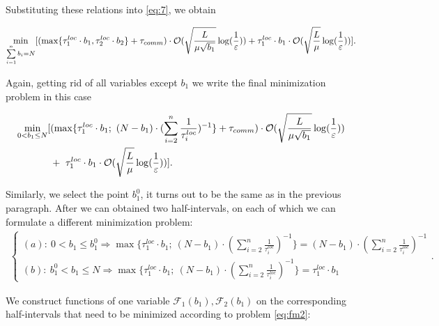 \documentclass{article}
\theoremstyle{definition}
\theoremstyle{plain}
\begin{document}
Substituting these relations into \eqref{eq:7}, we obtain

\begin{equation}
    \notag
    \underset{\sum\limits_{i = 1}^{n} b_i = N}{\min}[(\max\{\tau_1^{loc}\cdot b_1, \tau_2^{loc}\cdot b_2\} + \tau_{comm}) \cdot \mathcal O(\sqrt{\frac{L}{\mu \sqrt{b_1}}}\log(\frac{1}{\varepsilon})) + \tau_1^{loc}\cdot b_1 \cdot \mathcal O(\sqrt{\frac{L}{\mu}}\log(\frac{1}{\varepsilon}))].
\end{equation}

Again, getting rid of all variables except $b_1$ we write the final minimization problem in this case

\begin{eqnarray}
    \begin{split}
    \label{eq:fm2}
        \underset{0 < b_1 \leq N}{\min}[&(\max\{\tau_1^{loc}\cdot b_1; ~(N-b_1) \cdot (\sum\limits_{i = 2}^{n} \frac{1}{\tau_i^{loc}} )^{-1}\} + \tau_{comm}) \cdot \mathcal O(\sqrt{\frac{L}{\mu \sqrt{b_1}}}\log(\frac{1}{\varepsilon}))
        \\ &+ ~
        \tau_1^{loc}\cdot b_1 \cdot \mathcal O(\sqrt{\frac{L}{\mu}}\log(\frac{1}{\varepsilon}))]. \hspace{3.7cm}
    \end{split}
\end{eqnarray}

Similarly, we select the point $b_1^0$, it turns out to be the same as in the previous paragraph. After we can obtained two half-intervals, on each of which we can formulate a different minimization problem:
\begin{eqnarray*}
    \begin{cases}
    (a): ~ 0 < b_1 \leq b_1^0 \Rightarrow \max\{\tau_1^{loc}\cdot b_1; ~(N-b_1) \cdot (\sum\limits_{i = 2}^{n} \frac{1}{\tau_i^{loc}} )^{-1}\} = 
    (N-b_1) \cdot (\sum\limits_{i = 2}^{n} \frac{1}{\tau_i^{loc}})^{-1}
    \\
    (b): ~ b_1^0 <  b_1 \leq N \Rightarrow \max\{\tau_1^{loc}\cdot b_1; ~(N-b_1) \cdot (\sum\limits_{i = 2}^{n} \frac{1}{\tau_i^{loc}} )^{-1}\} = \tau_1^{loc}\cdot b_1
    \end{cases}.
\end{eqnarray*}

We construct functions of one variable $\mathcal{F}_1(b_1), \mathcal{F}_2(b_1)$ on the corresponding half-intervals that need to be minimized according to problem \eqref{eq:fm2}:
\end{document}

